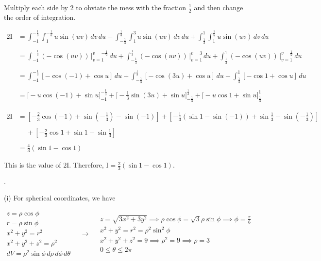 \documentclass{article}
\begin{document}
\hfill

\noindent Multiply each side by $2$ to obviate the mess with the fraction $\displaystyle\frac12$ and then change the order of integration.

\begin{align*}
2\mathrm{I}&=\int_{-1}^{\textstyle-\frac13}\int_1^{\textstyle-\frac1u}u\sin(uv)\,dv\,du+\int_{\textstyle-\frac13}^{\textstyle\frac13}\int_1^3u\sin(uv)\,dv\,du+\int_{\textstyle\frac13}^1\int_1^{\textstyle\frac1u}u\sin(uv)\,dv\,du\\\\&=\int_{-1}^{\textstyle-\frac13}(-\cos(uv))\,\bigg|_{v=1}^{v=-\frac1u}\,du+\int_{\textstyle-\frac13}^{\textstyle\frac13}(-\cos(uv))\,\bigg|_{v=1}^{v=3}\,du+\int_{\textstyle\frac13}^1(-\cos(uv))\,\bigg|_{v=1}^{v=\frac1u}\,du\\\\&=\int_{-1}^{\textstyle-\frac13}[-\cos(-1)+\cos u]\,du+\int_{\textstyle-\frac13}^{\textstyle\frac13}[-\cos(3u)+\cos u]\,du+\int_{\textstyle\frac13}^1[-\cos1+\cos u]\,du\\\\&=\bigg[-u\cos(-1)+\sin u\bigg]_{-1}^{\textstyle-\frac13}+\bigg[-\frac13\sin(3u)+\sin u\bigg]_{\textstyle-\frac13}^{\textstyle\frac13}+\bigg[-u\cos1+\sin u\bigg]_{\textstyle\frac13}^1
\end{align*}

\begin{align*}
2\mathrm{I}&=\left[-\frac23\cos(-1)+\sin\left(-\frac13\right)-\sin(-1)\right]+\left[-\frac13\left(\sin1-\sin(-1)\right)+\sin\frac13-\sin\left(-\frac13\right)\right]\\\\&\quad\:+\left[-\frac23\cos1+\sin1-\sin\frac13\right]\\\\&=\frac43(\sin1-\cos1)
\end{align*}

\noindent This is the value of $2\mathrm{I}$. Therefore, $\boxed{\mathrm{I}=\frac23(\sin1-\cos1)}$.

\hfill

.

\hfill

\noindent (i) For spherical coordinates, we have

\[
\begin{array}{c}
z=\rho\cos\phi\\
r=\rho\sin\phi\\
x^2+y^2=r^2\\
x^2+y^2+z^2=\rho^2\\
dV=\rho^2\sin\phi\,d\rho\,d\phi\,d\theta
\end{array}\quad\rightarrow\quad
\begin{array}{c}
\displaystyle z=\sqrt{3x^2+3y^2}\implies\rho\cos\phi=\sqrt3\rho\sin\phi\implies\phi=\frac\pi6\\[0.2cm]
x^2+y^2=r^2=\rho^2\sin^2\phi\\[0.1cm]
x^2+y^2+z^2=9\implies\rho^2=9\implies\rho=3\\[0.1cm]
0\leq\theta\leq2\pi
\end{array}
\]
\end{document}
